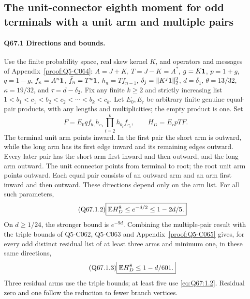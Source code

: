 \subsection{The unit-connector eighth moment for odd terminals with a unit arm and multiple pairs}\label{proof:Q5-C067}

\paragraph{Q67.1 Directions and bounds.}
Use the finite probability space, real skew kernel \(K\), and
operators and messages of Appendix~\ref{proof:Q5-C064}:
\(A=\allowbreak J+K\), \(T=\allowbreak J-K=\allowbreak A^*\), \(g=\allowbreak K\mathbf1\), \(p=\allowbreak 1+g\), \(q=\allowbreak 1-g\),
\(f_n=\allowbreak A^n\mathbf1\), \(\bar f_n=\allowbreak T^n\mathbf1\), \(h_n=\allowbreak Tf_{n-1}\),
\(\delta_j=\allowbreak \|K^j\mathbf1\|_2^2\), \(d=\allowbreak \delta_1\),
\(\theta=\allowbreak 13/32\), \(\kappa=\allowbreak 19/32\), and \(\tau=\allowbreak d-\delta_2\).
Fix any finite \(k\ge\allowbreak 2\) and strictly increasing list
\(1<\allowbreak b_1<\allowbreak c_1<\allowbreak b_2<\allowbreak c_2<\allowbreak \cdots<\allowbreak b_k<\allowbreak c_k\).
Let \(E_0,\allowbreak E_r\) be arbitrary finite genuine equal-pair products,
with any lengths and multiplicities; the empty product is one.
Set
\begin{equation}\tag{Q67.1.1}\label{eq:Q67:1.1}
F=E_0qf_{b_1}h_{c_1}\prod_{i=2}^kh_{b_i}f_{c_i},
\qquad H_D=E_rpTF.
\end{equation}
The terminal unit arm points inward. In the first pair the short arm
is outward, while the long arm has its first edge inward and its
remaining edges outward. Every later pair has the short arm first
inward and then outward, and the long arm outward. The unit connector
points from terminal to root; the root unit arm points outward.
Each equal pair consists of an outward arm and an arm first inward
and then outward. These directions depend only on the arm list.
For all such parameters,
\begin{equation}\tag{Q67.1.2}\label{eq:Q67:1.2}
\boxed{\mathbb E H_D^8\le e^{-d/2}\le1-2d/5.}
\end{equation}
On \(d\ge\allowbreak 1/24\), the stronger bound is \(e^{-9d}\).
Combining the multiple-pair result with the triple bounds of
Q5-C062, Q5-C063 and Appendix~\ref{proof:Q5-C065} gives, for every
odd distinct residual list of at least three arms and minimum one,
in these same directions,
\begin{equation}\tag{Q67.1.3}\label{eq:Q67:1.3}
\boxed{\mathbb E H_D^8\le1-d/601.}
\end{equation}
Three residual arms use the triple bounds; at least five use
\eqref{eq:Q67:1.2}. Residual zero and one follow the reduction to
fewer branch vertices.

